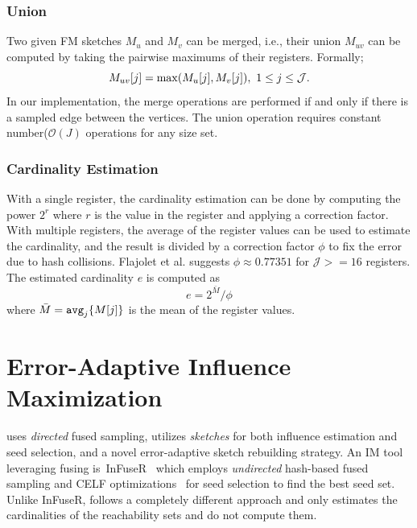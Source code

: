 \documentclass[final,5p,times,twocolumn]{elsarticle}
\newcommand\acro{{\sc{HyperFuseR\xspace}\xspace}\xspace}
\begin{document}
\subsubsection{Union}
Two given FM sketches $M_u$ and $M_v$ can be merged, i.e., their union $M_{uv}$ can be computed by taking the pairwise maximums of their registers. Formally; 
\begin{equation}
\label{eq:sketch-merge}
    M_{uv}[j] = \max(M_u[j], M_v[j]),~1 \leq j \leq {\cal J}.
\end{equation} 
In our implementation, the merge operations are performed if and only if there is a sampled edge between the vertices. The union operation requires constant number($\mathcal{O}(J)$ operations for any size set. 


\subsubsection{Cardinality Estimation}
With a single register, the cardinality estimation can be done by computing the power $2^r$ where $r$ is the value in the register and applying a correction factor. With multiple registers, the average of the register values can be used to estimate the cardinality, and the result is divided by a correction factor $\phi$ to fix the error due to hash collisions. Flajolet et al. \cite{flajolet1985probabilistic} suggests $\phi \approx 0.77351$ for $\mathcal{J}>=16$ registers. The estimated cardinality $e$ is computed as
\begin{equation}
    \label{eq:sketch-estimate}
    e = 2^{\bar{M}}/\phi
\end{equation} 
where $\bar{M} = {\tt{avg}}_j\{M[j]\}$ is the mean of the register values.


\section{Error-Adaptive Influence Maximization}\label{sec:method}

\acro{} uses {\em directed} fused sampling, utilizes \emph{sketches} for both influence estimation and seed selection, and a novel error-adaptive sketch rebuilding strategy. An IM tool leveraging fusing is~{\sc InFuseR}~\cite{infuser} which employs {\emph {undirected}} hash-based fused sampling and CELF optimizations~\cite{CELF} for seed selection to find the best seed set. Unlike {\sc InFuseR}, \acro{} follows a completely different approach and only estimates the cardinalities of the reachability sets and do not compute them. 
\end{document}
